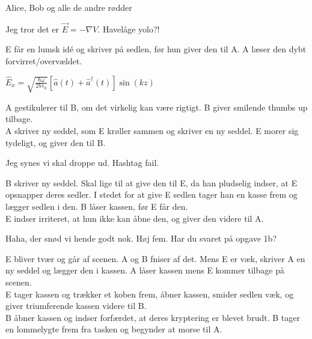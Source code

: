 \begin{Sketch}{Alice, Bob og alle de andre rødder}
\begin{Replik}[S]
  Jeg tror det er $\vec{E} = -\nabla V$.  Havelåge yolo?!
\end{Replik}

\begin{Regi}
   E får en lumsk idé og skriver på sedlen, før hun giver den til
  A. A læser den dybt forvirret/overvældet.
\end{Regi}

\begin{Replik}[S]
  $\hat{E}_x = \sqrt{\frac{\hbar\omega}{2V\epsilon_0}}
  \left[\hat{a}(t) + \hat{a}^\dagger (t)\right] \sin (kz)$ 
\end{Replik}

\begin{Regi}
  A gestikulerer til B, om det virkelig kan være rigtigt. B giver
  smilende thumbs up tilbage. \\
  A skriver ny seddel, som E krøller sammen og skriver en ny seddel. E
  morer sig tydeligt, og giver den til B.
\end{Regi}

\begin{Replik}[S]
  Jeg synes vi skal droppe ud. Hashtag fail.
\end{Replik}

\begin{Regi}
  B skriver ny seddel. Skal lige til at give den til E, da han
  pludselig indser, at E opsnapper deres sedler. I stedet for at give
  E sedlen tager han en kasse frem og lægger sedlen i den. B låser
  kassen, før E får den. \\
  E indser irriteret, at hun ikke kan åbne den,
  og giver den videre til A.
\end{Regi}

\begin{Replik}[S]
  Haha, der snød vi hende godt nok. Høj fem. Har du svaret på opgave 1b?
\end{Replik}

\begin{Regi}
  E bliver tvær og går af scenen. A og B fniser af det. Mens E er væk,
  skriver A en ny seddel og lægger den i kassen. A låser kassen mens E
  kommer tilbage på scenen. \\
  E tager kassen og trækker et koben frem, åbner kassen, smider sedlen
  væk, og giver triumferende kassen videre til B.\\
  B åbner kassen og indser forfærdet, at deres kryptering er blevet
  brudt. B tager en lommelygte frem fra tasken og begynder at morse
  til A.
\end{Regi}


\end{Sketch}
